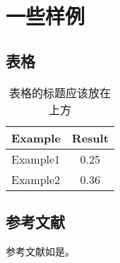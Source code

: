 
\section{一些样例}

\subsection{表格}

\begin{table}[htb]
    \begin{center}
        \caption{表格的标题应该放在上方}\label{table}
        \begin{tabular}{lc} %
            \toprule
            Example & Result \\
            \midrule
            Example1          & 0.25 \\
            Example2          & 0.36 \\
            \bottomrule
        \end{tabular}
    \end{center}
\end{table}

\subsection{参考文献}

参考文献如是\cite{Nicholas1998Handbook}。
